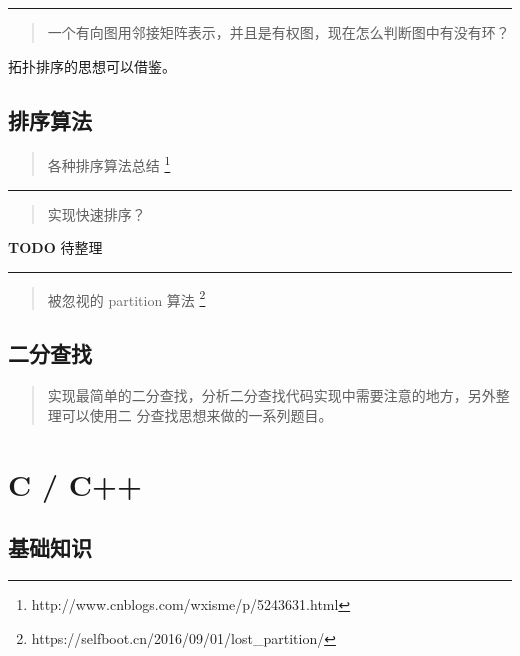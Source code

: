 \noindent\rule[0.25\baselineskip]{\textwidth}{1pt}

\begin{quotation}
{\color{red}一个有向图用邻接矩阵表示，并且是有权图，现在怎么判断图中有没有环？}
\end{quotation}

拓扑排序的思想可以借鉴。



\subsection{排序算法}\label{subsec:sort-algorithms}


\begin{quotation}
  {\color{red}各种排序算法总结}%
  \footnote{http://www.cnblogs.com/wxisme/p/5243631.html}%
\end{quotation}


\noindent\rule[0.25\baselineskip]{\textwidth}{1pt}

\begin{quotation}
{\color{red}实现快速排序？}
\end{quotation}

\textbf{TODO} 待整理


\noindent\rule[0.25\baselineskip]{\textwidth}{1pt}

\begin{quotation}
  {\color{red}被忽视的 partition 算法}%
  \footnote{https://selfboot.cn/2016/09/01/lost\_partition/}%
\end{quotation}



\subsection{二分查找}\label{subsec:binary-search}

\begin{quotation}
  {\color{red}实现最简单的二分查找，分析二分查找代码实现中需要注意的地方，另外整理可以使用二
  分查找思想来做的一系列题目。}
\end{quotation}


\section{C / C++}\label{sec:c-and-cplusplus}

\subsection{基础知识}

